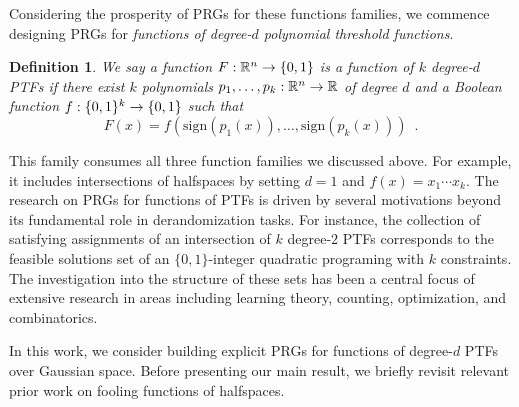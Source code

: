 \documentclass[12pt]{article}
\newtheorem{definition}[theorem]{Definition}
\newcommand{\sign}[1]{\mathrm{sign}\!\br{#1}}
\newcommand{\br}[1]{\left(#1\right)} \newcommand{\Br}[1]{\left[#1\right]} \newcommand{\st}[1]{\left\{#1\right\}} \newcommand{\tr}[1]{\mathrm{Tr}\!\Br{#1}} \newcommand{\abs}[1]{\left|#1 \right|} \newcommand{\norm}[1]{\left\lVert #1 \right\rVert} \newcommand{\agl}[2]{\theta^{\br{#1}}_{#2}} \newcommand{\aglp}[2]{{\theta'}^{\br{#1}}_{#2}} \newcommand{\lint}[1]{\left\lfloor#1\right\rfloor} \newcommand{\poly}[1]{\mathrm{poly}\!\br{#1}} \newcommand{\negl}[1]{\mathrm{negl}\!\br{#1}} \newcommand{\de}[1]{\mathrm{d}#1} \newcommand{\val}[1]{\mathrm{val}\!\br{#1}} \newcommand{\vall}[1]{\mathrm{val}\br{#1}} \newcommand{\nd}[1]{\mathcal{N}\!\br{#1}} \newcommand{\ketbratwo}[2]{\ket{#1} \hspace{-0.4em}\bra{#2}} \newcommand{\ketbra}[1]{\ketbratwo{#1}{#1}} \newcommand{\id}{\ensuremath{\mathds{1}}} \newcommand{\ogroup}[1]{\mathrm{O}\!\br{#1}} \newcommand{\ugroup}[1]{\mathrm{U}\!\br{#1}} \newcommand{\td}{\mathrm{TD}} \newcommand{\tv}[1]{\norm{#1}_{\mathrm{TV}}} \newcommand {\defeq} {\ensuremath{ \stackrel{\mathrm{def}}{=} }} \newcommand{\vdim}{\ensuremath{N}} \newcommand{\dimin}{\ensuremath{n}} \newcommand{\dimout}{\ensuremath{m}} \newcommand{\ncopy}{\ell} \newcommand{\hspacein}{\H_\mathrm{in}} \newcommand{\hspaceout}{\H_\mathrm{out}} \newcommand{\Sin}{\S(\hspacein)} \newcommand{\Sout}{\S(\hspaceout)} \newcommand{\haar}{\ensuremath{\mu}} \newcommand{\tensorhaar}{\ensuremath{\eta}} \newcommand{\tensorsrss}{\ensuremath{\nu}} \newcommand{\qadvice}{\ensuremath{\rho}} \newcommand{\tp}{\otimes} \newcommand{\wone}[2]{W_1\!\br{#1,#2}}
\begin{document}
Considering the prosperity of PRGs for these functions families, we commence designing PRGs for
\emph{functions of degree-$d$ polynomial threshold functions}.
\begin{definition}
	We say a function $F:\mathbb{R}^n\to\{0,1\}$ is a function of $k$ degree-$d$ PTFs if there exist $k$ polynomials $p_1,\dots,p_k:\mathbb{R}^n \to \mathbb{R}$ of degree $d$ and a Boolean function $f:\bit{k}\to\st{0,1}$ such that
	\[
		F(x) = f\!\br{\sign{p_1\!(x)},\dots,\sign{p_k\!(x)}}\enspace .
	\]
\end{definition}
\noindent This family consumes all three function families we discussed above. For example, it includes intersections of halfspaces by setting $d=1$ and $f(x)=x_1\cdots x_k$.
The research on PRGs for functions of PTFs is driven by several motivations beyond its fundamental role in derandomization tasks.
For instance, the collection of satisfying assignments of an intersection of $k$ degree-$2$ PTFs corresponds to the feasible solutions set of an $\{0,1\}$-integer quadratic programing \cite{NW06} with $k$ constraints.
The investigation into the structure of these sets has been a central focus of extensive research in areas including learning theory, counting, optimization, and combinatorics.

In this work, we consider building explicit PRGs for functions of degree-$d$ PTFs over Gaussian space. Before presenting our main result, we briefly revisit relevant prior work on fooling functions of halfspaces.
\end{document}
